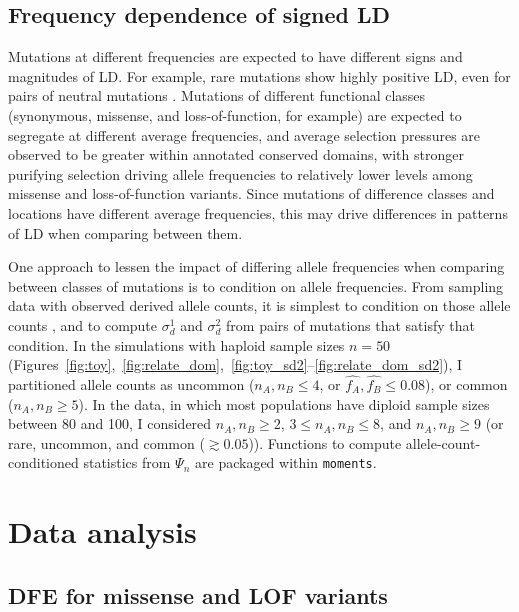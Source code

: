 \documentclass[]{article}
\begin{document}
\subsection{Frequency dependence of signed LD}

Mutations at different frequencies are expected to have different signs and
magnitudes of LD. For example, rare mutations show highly positive LD, even for
pairs of neutral mutations \citep{Good2022-ot}. Mutations of different
functional classes (synonymous, missense, and loss-of-function, for example)
are expected to segregate at different average frequencies, and average
selection pressures are observed to be greater within annotated conserved
domains, with stronger purifying selection driving allele frequencies to
relatively lower levels among missense and loss-of-function variants. Since
mutations of difference classes and locations have different average
frequencies, this may drive differences in patterns of LD when comparing
between them.

One approach to lessen the impact of differing allele frequencies when
comparing between classes of mutations is to condition on allele frequencies.
From sampling data with observed derived allele counts, it is simplest to
condition on those allele counts \citep[e.g.,\(n_A,n_B=2\),][]{Garcia2021-zn},
and to compute \(\sigma_d^1\) and \(\sigma_d^2\) from pairs of mutations that
satisfy that condition. In the simulations with haploid sample sizes \(n=50\)
(Figures~\ref{fig:toy},~\ref{fig:relate_dom},~\ref{fig:toy_sd2}--\ref{fig:relate_dom_sd2}),
I partitioned allele counts as uncommon (\(n_A, n_B \leq 4\), or \(\hat{f_A},
\hat{f_B} \leq 0.08\)), or common (\(n_A, n_B \geq 5\)). In the
\citet{1000_Genomes_Project_Consortium2015-zq} data, in which most populations
have diploid sample sizes between 80 and 100, I considered \(n_A, n_B \geq 2\),
\(3\leq n_A, n_B \leq 8\), and \(n_A, n_B \geq 9\) (or rare, uncommon, and
common (\(\gtrsim 0.05\))). Functions to compute allele-count-conditioned
statistics from \(\Psi_n\) are packaged within \texttt{moments}.

\section{Data analysis}

\subsection{DFE for missense and LOF variants}
\end{document}
